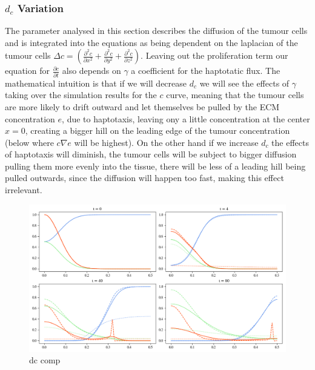 \subsubsection*{$d_c$ Variation}
The parameter analysed in this section describes the diffusion of the tumour cells and is integrated into the equations as being dependent on the laplacian of the tumour cells $\Delta c = (\frac{\partial^2 c}{\partial x^2} + \frac{\partial^2 c}{\partial y^2} + \frac{\partial^2 c}{\partial z^2})$. Leaving out the proliferation term our equation for $\frac{\partial c}{\partial t}$ also depends on $\gamma$ a coefficient for the haptotatic flux. The mathematical intuition is that if we will decrease $d_c$ we will see the effects of $\gamma$ taking over the simulation results for the $c$ curve, meaning that the tumour cells are more likely to drift outward and let themselves be pulled by the ECM concentration $e$, due to haptotaxis, leaving ony a little concentration at the center $x=0$, creating a bigger hill on the leading edge of the tumour concentration (below where $c \nabla e$ will be highest). On the other hand if we increase $d_c$ the effects of haptotaxis will diminish, the tumour cells will be subject to bigger diffusion pulling them more evenly into the tissue, there will be less of a leading hill being pulled outwards, since the diffusion will happen too fast, making this effect irrelevant. 
\begin{figure}[h]
    \centering
    \includegraphics[width=\textwidth]{resources/images/dc_variation.png}
    \caption{dc comp}
    \label{fig:dc_comparison}
\end{figure}

